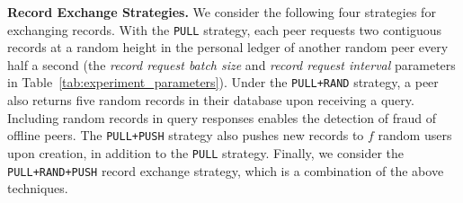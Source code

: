 \textbf{Record Exchange Strategies.}
We consider the following four strategies for exchanging records.
With the \texttt{PULL} strategy, each peer requests two contiguous records at a random height in the personal ledger of another random peer every half a second (the \emph{record request batch size} and \emph{record request interval} parameters in Table~\ref{tab:experiment_parameters}).
Under the \texttt{PULL+RAND} strategy, a peer also returns five random records in their database upon receiving a query.
Including random records in query responses enables the detection of fraud of offline peers.
The \texttt{PULL+PUSH} strategy also pushes new records to $ f $ random users upon creation, in addition to the \texttt{PULL} strategy.
Finally, we consider the \texttt{PULL+RAND+PUSH} record exchange strategy, which is a combination of the above techniques.

